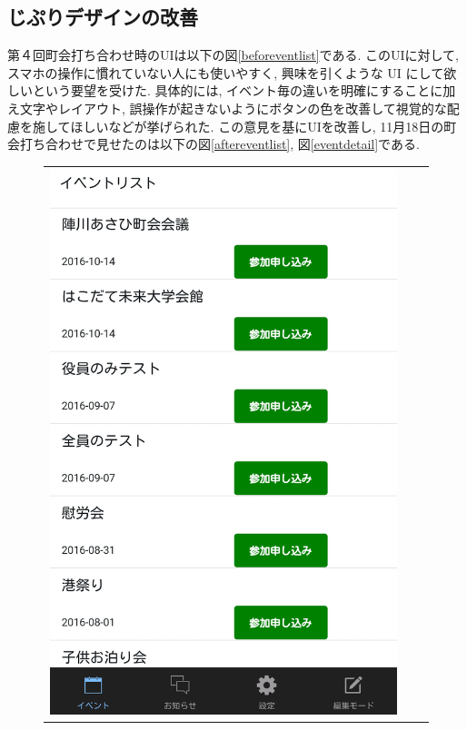 \subsection{じぷりデザインの改善}
第４回町会打ち合わせ時のUIは以下の図\ref{beforeventlist}である.
このUIに対して, スマホの操作に慣れていない人にも使いやすく, 興味を引くような UI にして欲しいという要望を受けた.
具体的には, イベント毎の違いを明確にすることに加え文字やレイアウト, 誤操作が起きないようにボタンの色を改善して視覚的な配慮を施してほしいなどが挙げられた.
この意見を基にUIを改善し, 11月18日の町会打ち合わせで見せたのは以下の図\ref{aftereventlist}, 図\ref{eventdetail}である.

\begin{figure}[h]
    \begin{tabular}{ccc}
      \begin{minipage}[t]{0.3\hsize}
        \centering
        \includegraphics[keepaspectratio, scale=0.09]{picture/ui_update/beforupdate.png}

\end{minipage}
\end{tabular}
\end{figure}
